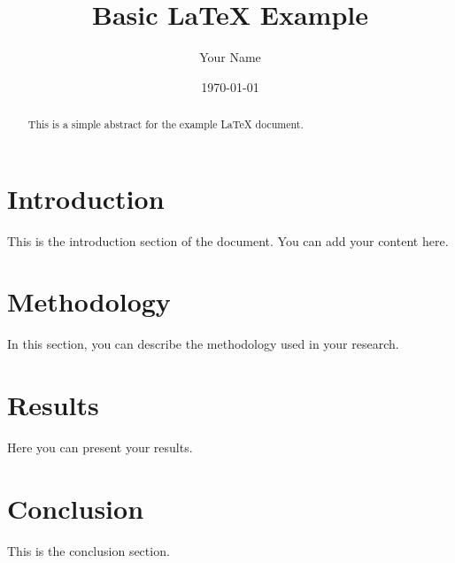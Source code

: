 \documentclass{article}
\title{Basic LaTeX Example}
\author{Your Name}
\date{\today}
\begin{document}
\maketitle

\begin{abstract}
  This is a simple abstract for the example LaTeX document.
\end{abstract}

\section{Introduction}
This is the introduction section of the document. You can add your content here.

\section{Methodology}
In this section, you can describe the methodology used in your research.

\section{Results}
Here you can present your results.

\section{Conclusion}
This is the conclusion section.
\end{document}
